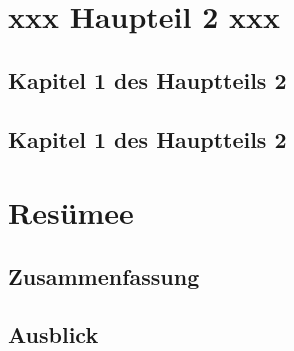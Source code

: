\documentclass[
		fontsize=10pt,		%
		a4paper,			%
		parskip=half-,		%
		twoside,			%
		headings=big,	%
		appendixprefix=true,
		]{scrreprt}		%
\begin{document}
\cleardoublepage
\part{xxx Haupteil 2 xxx}\label{part:xxx-haupteil2-xxx}


%

\chapter{Kapitel 1 des Hauptteils 2}\label{chapter:xxxname21xxx}
%

\chapter{Kapitel 1 des Hauptteils 2}\label{chapter:xxxname22xxx}
%







\cleardoublepage



\part{Resümee}\label{part:resumee}

\chapter{Zusammenfassung}
%

\chapter{Ausblick}
%
\end{document}
